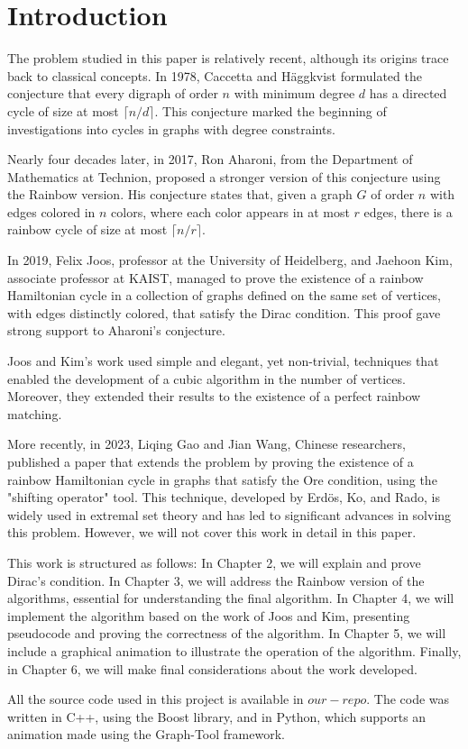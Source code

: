 
\chapter{Introduction}

The problem studied in this paper is relatively recent, although its origins trace back to classical concepts. 
In 1978, Caccetta and Häggkvist formulated the conjecture that every digraph of order $n$ with minimum degree $d$ 
has a directed cycle of size at most $\lceil n/d \rceil$. This conjecture marked the beginning of investigations 
into cycles in graphs with degree constraints.

Nearly four decades later, in 2017, Ron Aharoni, from the Department of Mathematics at Technion, proposed a stronger 
version of this conjecture using the Rainbow version. His conjecture states that, given a graph $G$ of order $n$ 
with edges colored in $n$ colors, where each color appears in at most $r$ edges, there is a rainbow cycle of size 
at most $\lceil n/r \rceil$.

In 2019, Felix Joos, professor at the University of Heidelberg, and Jaehoon Kim, associate professor at KAIST, 
managed to prove the existence of a rainbow Hamiltonian cycle in a collection of graphs defined on the same set 
of vertices, with edges distinctly colored, that satisfy the Dirac condition. This proof gave strong support to 
Aharoni's conjecture.

Joos and Kim's work used simple and elegant, yet non-trivial, techniques that enabled the development of a cubic 
algorithm in the number of vertices. Moreover, they extended their results to the existence of a perfect rainbow 
matching.

More recently, in 2023, Liqing Gao and Jian Wang, Chinese researchers, published a paper that extends the problem 
by proving the existence of a rainbow Hamiltonian cycle in graphs that satisfy the Ore condition, using the 
"shifting operator" tool. This technique, developed by Erdös, Ko, and Rado, is widely used in extremal set theory 
and has led to significant advances in solving this problem. However, we will not cover this work in detail in 
this paper.

This work is structured as follows: In Chapter 2, we will explain and prove Dirac's condition. In Chapter 3, we 
will address the Rainbow version of the algorithms, essential for understanding the final algorithm. In Chapter 4, 
we will implement the algorithm based on the work of Joos and Kim, presenting pseudocode and proving the correctness 
of the algorithm. In Chapter 5, we will include a graphical animation to illustrate the operation of the algorithm. 
Finally, in Chapter 6, we will make final considerations about the work developed.

All the source code used in this project is available in $our-repo$. The code was written in C++, using the Boost 
library, and in Python, which supports an animation made using the Graph-Tool framework.





